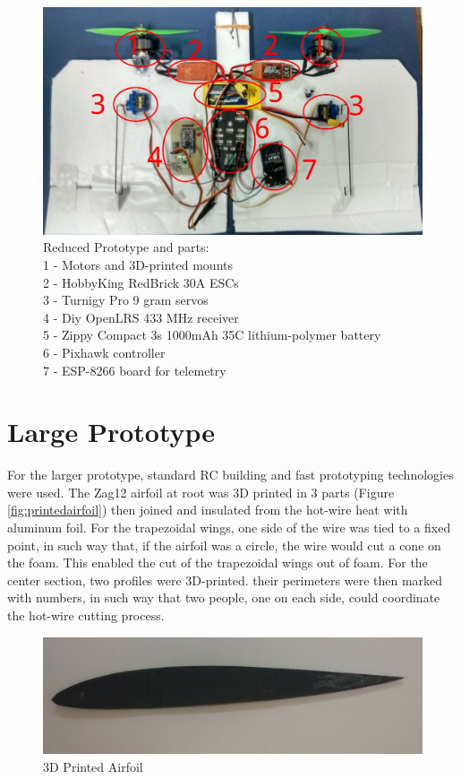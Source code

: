 \begin{figure}[H]
\centering
  \includegraphics[width=\linewidth]{figs/reducedprototype.jpg}
  \caption{Reduced Prototype and parts:\\
   1 - Motors and 3D-printed mounts\\
   2 - HobbyKing RedBrick 30A ESCs\\
   3 - Turnigy Pro 9 gram servos\\
   4 - Diy OpenLRS 433 MHz receiver\\
   5 - Zippy Compact 3s 1000mAh 35C lithium-polymer battery\\
   6 - Pixhawk controller\\
   7 - ESP-8266 board for telemetry}
  \label{fig:smallprototypeparts}
\end{figure}

\section{Large Prototype}

For the larger prototype, standard RC building and fast prototyping technologies were used.
The Zag12 airfoil at root was 3D printed in 3 parts (Figure \ref{fig:printedairfoil}) then joined and insulated from the hot-wire heat with aluminum foil. For the trapezoidal wings, one side of the wire was tied to a fixed point, in such way that, if the airfoil was a circle, the wire would cut a cone on the foam. This enabled the cut of the trapezoidal wings out of foam. For the center section, two profiles were 3D-printed. their perimeters were then marked with numbers, in such way that two people, one on each side, could coordinate the hot-wire cutting process.

\begin{figure}[H]
\centering
  \includegraphics[width=\linewidth]{figs/printedairfoil.png}
  \caption{3D Printed Airfoil}
  \label{ffig:printedairfoil}
\end{figure}



